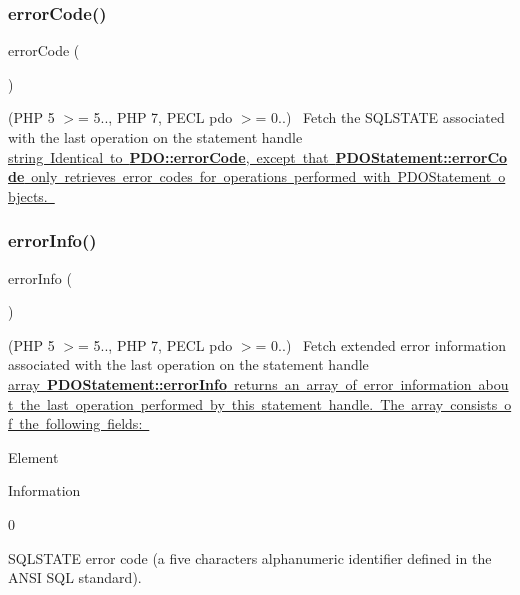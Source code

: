 \subsubsection{\texorpdfstring{error\+Code()}{errorCode()}}
{\footnotesize\ttfamily error\+Code (\begin{DoxyParamCaption}{ }\end{DoxyParamCaption})}

(P\+HP 5 $>$= 5.., P\+HP 7, P\+E\+CL pdo $>$= 0..)~\newline
 Fetch the S\+Q\+L\+S\+T\+A\+TE associated with the last operation on the statement handle \mbox{\hyperlink{}{string Identical to {\bfseries P\+D\+O\+::error\+Code}, except that {\bfseries P\+D\+O\+Statement\+::error\+Code} only retrieves error codes for operations performed with P\+D\+O\+Statement objects. }}\mbox{\label{interface_pes_1_1_database_1_1_statement_1_1_p_d_o_statement_interface_ac5230ce6cd46c5e922146a441d807877}} 
\subsubsection{\texorpdfstring{error\+Info()}{errorInfo()}}
{\footnotesize\ttfamily error\+Info (\begin{DoxyParamCaption}{ }\end{DoxyParamCaption})}

(P\+HP 5 $>$= 5.., P\+HP 7, P\+E\+CL pdo $>$= 0..)~\newline
 Fetch extended error information associated with the last operation on the statement handle \mbox{\hyperlink{}{array {\bfseries P\+D\+O\+Statement\+::error\+Info} returns an array of error information about the last operation performed by this statement handle. The array consists of the following fields\+: }} 

Element 

Information  

0 

S\+Q\+L\+S\+T\+A\+TE error code (a five characters alphanumeric identifier defined in the A\+N\+SI S\+QL standard).  

